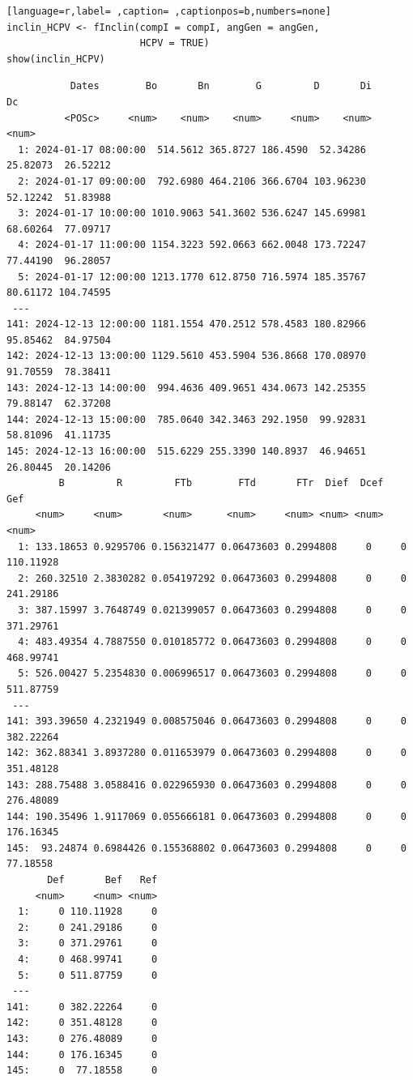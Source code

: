 \begin{itemize}
\begin{lstlisting}[language=r,label= ,caption= ,captionpos=b,numbers=none]
inclin_HCPV <- fInclin(compI = compI, angGen = angGen,
                       HCPV = TRUE)
show(inclin_HCPV)
\end{lstlisting}

\begin{verbatim}
		   Dates        Bo       Bn        G         D       Di        Dc
		  <POSc>     <num>    <num>    <num>     <num>    <num>     <num>
  1: 2024-01-17 08:00:00  514.5612 365.8727 186.4590  52.34286 25.82073  26.52212
  2: 2024-01-17 09:00:00  792.6980 464.2106 366.6704 103.96230 52.12242  51.83988
  3: 2024-01-17 10:00:00 1010.9063 541.3602 536.6247 145.69981 68.60264  77.09717
  4: 2024-01-17 11:00:00 1154.3223 592.0663 662.0048 173.72247 77.44190  96.28057
  5: 2024-01-17 12:00:00 1213.1770 612.8750 716.5974 185.35767 80.61172 104.74595
 ---                                                                             
141: 2024-12-13 12:00:00 1181.1554 470.2512 578.4583 180.82966 95.85462  84.97504
142: 2024-12-13 13:00:00 1129.5610 453.5904 536.8668 170.08970 91.70559  78.38411
143: 2024-12-13 14:00:00  994.4636 409.9651 434.0673 142.25355 79.88147  62.37208
144: 2024-12-13 15:00:00  785.0640 342.3463 292.1950  99.92831 58.81096  41.11735
145: 2024-12-13 16:00:00  515.6229 255.3390 140.8937  46.94651 26.80445  20.14206
	     B         R         FTb        FTd       FTr  Dief  Dcef       Gef
	 <num>     <num>       <num>      <num>     <num> <num> <num>     <num>
  1: 133.18653 0.9295706 0.156321477 0.06473603 0.2994808     0     0 110.11928
  2: 260.32510 2.3830282 0.054197292 0.06473603 0.2994808     0     0 241.29186
  3: 387.15997 3.7648749 0.021399057 0.06473603 0.2994808     0     0 371.29761
  4: 483.49354 4.7887550 0.010185772 0.06473603 0.2994808     0     0 468.99741
  5: 526.00427 5.2354830 0.006996517 0.06473603 0.2994808     0     0 511.87759
 ---                                                                           
141: 393.39650 4.2321949 0.008575046 0.06473603 0.2994808     0     0 382.22264
142: 362.88341 3.8937280 0.011653979 0.06473603 0.2994808     0     0 351.48128
143: 288.75488 3.0588416 0.022965930 0.06473603 0.2994808     0     0 276.48089
144: 190.35496 1.9117069 0.055666181 0.06473603 0.2994808     0     0 176.16345
145:  93.24874 0.6984426 0.155368802 0.06473603 0.2994808     0     0  77.18558
       Def       Bef   Ref
     <num>     <num> <num>
  1:     0 110.11928     0
  2:     0 241.29186     0
  3:     0 371.29761     0
  4:     0 468.99741     0
  5:     0 511.87759     0
 ---                      
141:     0 382.22264     0
142:     0 351.48128     0
143:     0 276.48089     0
144:     0 176.16345     0
145:     0  77.18558     0
\end{verbatim}
\end{itemize}

